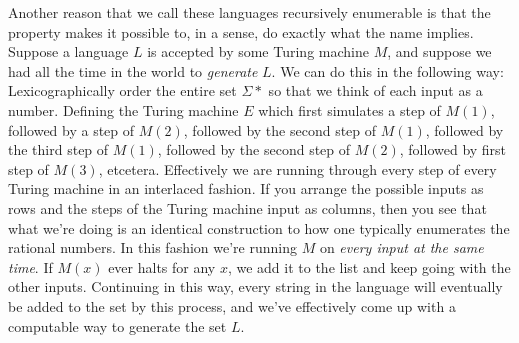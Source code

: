 \par Another reason that we call these languages recursively enumerable is that the property makes it possible to, in a sense, do exactly what the name implies. Suppose a language $L$ is accepted by some Turing machine $M$, and suppose we had all the time in the world to \textit{generate} $L$. We can do this in the following way: Lexicographically order the entire set $\Sigma*$ so that we think of each input as a number. Defining the Turing machine $E$ which first simulates a step of $M(1)$, followed by a step of $M(2)$, followed by the second step of $M(1)$, followed by the third step of $M(1)$, followed by the second step of $M(2)$, followed by first step of $M(3)$, etcetera. Effectively we are running through every step of every Turing machine in an interlaced fashion. If you arrange the possible inputs as rows and the steps of the Turing machine input as columns, then you see that what we're doing is an identical construction to how one typically enumerates the rational numbers. In this fashion we're running $M$ on \textit{every input at the same time}. If $M(x)$ ever halts for any $x$, we add it to the list and keep going with the other inputs. Continuing in this way, every string in the language will eventually be added to the set by this process, and we've effectively come up with a computable way to generate the set $L$. 
